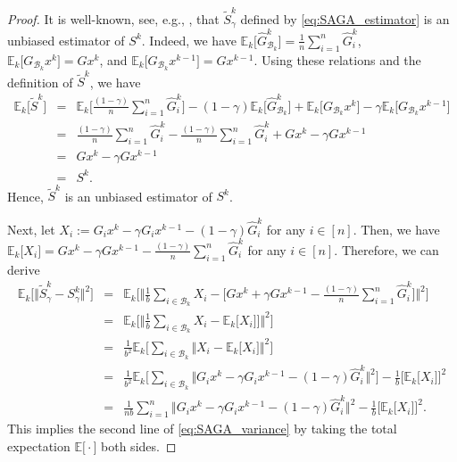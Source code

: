 \documentclass{article}
\newcommand{\norms}[1]{\Vert#1\Vert}
\newcommand{\Expsk}[2]{\mathbb{E}_{#1}\big[#2\big]}
\newcommand{\Expk}[1]{\mathbb{E}\big[#1\big]}
\newcommand{\Bc}{\mathcal{B}}
\theoremstyle{plain}
\theoremstyle{definition}
\theoremstyle{remark}
\begin{document}
\begin{proof}
It is well-known, see, e.g., \citep{Defazio2014}, that $\widetilde{S}^k_{\gamma}$ defined by \eqref{eq:SAGA_estimator} is an unbiased estimator of $S^k$.
Indeed, we have $\Expsk{k}{\hat{G}_{\Bc_k}^k} = \frac{1}{n}\sum_{i=1}^n\hat{G}_i^k$, $\Expsk{k}{G_{\Bc_k}x^k} = Gx^k$, and $\Expsk{k}{G_{\Bc_k}x^{k-1}} = Gx^{k-1}$.
Using these relations and the definition of $\widetilde{S}^k$, we have
\begin{equation*}
\begin{array}{lcl}
\Expsk{k}{\widetilde{S}^k} & = &  \Expsk{k}{\frac{(1-\gamma)}{n}\sum_{i=1}^n\hat{G}_i^k} - (1-\gamma)\Expsk{k}{\hat{G}_{\Bc_k}^k} + \Expsk{k}{G_{\Bc_k}x^k} - \gamma \Expsk{k}{G_{\Bc_k}x^{k-1}} \\
& = & \frac{(1-\gamma)}{n}\sum_{i=1}^n\hat{G}_i^k - \frac{(1-\gamma)}{n}\sum_{i=1}^n\hat{G}_i^k + Gx^k - \gamma Gx^{k-1} \\
& = &  Gx^k - \gamma Gx^{k-1} \\
& = & S^k.
\end{array}
\end{equation*}
Hence, $\widetilde{S}^k$ is an unbiased estimator of $S^k$.

Next, let $X_i := G_ix^k - \gamma G_ix^{k-1} - (1-\gamma)\hat{G}_i^k$ for any $i \in [n]$.
Then, we have $\Expsk{k}{X_i} = Gx^k - \gamma Gx^{k-1} -  \frac{(1-\gamma)}{n}\sum_{i=1}^n\hat{G}^k_i$ for any $i \in [n]$.
Therefore, we can derive
\begin{equation*} 
\begin{array}{lcl}
\Expsk{k}{ \norms{  \widetilde{S}_{\gamma}^k - S_{\gamma}^k }^2 } & = & \Expsk{k}{\norms{ \frac{1}{b}\sum_{i\in\Bc_k}X_i  -  \big[ Gx^k + \gamma Gx^{k-1}  -  \frac{(1-\gamma)}{n}\sum_{i=1}^n \hat{G}_i^k \big] }^2 } \\
& = & \Expsk{k}{\norms{ \frac{1}{b}\sum_{i\in\Bc_k}X_i  -  \Expsk{k}{X_i} ] }^2 } \\
& = & \frac{1}{b^2} \Expsk{k}{ \sum_{i\in\Bc_k}\norms{X_i - \Expsk{k}{X_i} }^2 } \\
& = & \frac{1}{b^2} \Expsk{k}{ \sum_{i\in\Bc_k}\norms{  G_ix^k - \gamma G_ix^{k-1} - (1-\gamma)\hat{G}_i^k }^2 } - \frac{1}{b} \big[ \Expsk{k}{X_i} \big]^2 \\
& = & \frac{1}{n b}  \sum_{i = 1}^n \norms{  G_ix^k - \gamma G_ix^{k-1} - (1-\gamma)\hat{G}_i^k }^2 - \frac{1}{b} \big[ \Expsk{k}{X_i} \big]^2.
\end{array}
\end{equation*}
This implies the second line of \eqref{eq:SAGA_variance} by taking the total expectation $\Expk{\cdot}$ both sides.


\end{proof}
\end{document}
